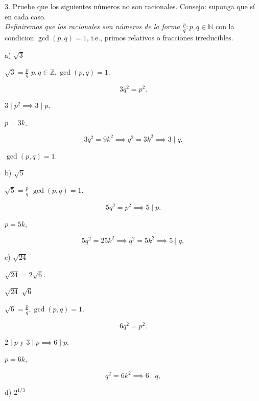 3. Pruebe que los siguientes números no son racionales. Consejo: suponga que sí en cada caso. \\

\textit{Definiremos que los racionales son números de la forma $\frac{p}{q} : p,q\in \mathbb{N}$} con la condicion $\gcd(p, q) = 1$, i.e., primos relativos o fracciones irreducibles.

{a) } \(\sqrt{3}\) 

 \(\sqrt{3} = \frac{p}{q}\)  \(p, q \in \mathbb{Z}, \gcd(p,q) = 1\).

\[
3q^2 = p^2.
\]

 \(3 \mid p^2 \implies 3 \mid p\).

 \(p = 3k\), 

\[
3q^2 = 9k^2 \implies q^2 = 3k^2 \implies 3 \mid q.
\]

 \(\gcd(p,q) = 1\).

\medskip

{b) } \(\sqrt{5}\) 

 \(\sqrt{5} = \frac{p}{q}\)  \(\gcd(p,q) = 1\).

\[
5q^2 = p^2 \implies 5 \mid p.
\]

 \(p = 5k\), 

\[
5q^2 = 25k^2 \implies q^2 = 5k^2 \implies 5 \mid q,
\]


\medskip

{c) } \(\sqrt{24}\) 

 \(\sqrt{24} = 2\sqrt{6}\).

 \(\sqrt{24}\)  \(\sqrt{6}\) 

 \(\sqrt{6} = \frac{p}{q}, \gcd(p,q) = 1\).

\[
6q^2 = p^2.
\]

 \(2 \mid p \text{ y } 3 \mid p \implies 6 \mid p\).

 \(p = 6k\), \implies 

\[
q^2 = 6k^2 \implies 6 \mid q,
\]


\medskip

{d) } \(2^{1/3}\) 

